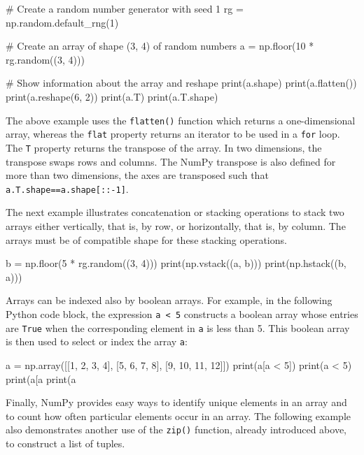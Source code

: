 \begin{samepage}
\begin{pythoncode}
# Create a random number generator with seed 1
rg = np.random.default_rng(1)

# Create an array of shape (3, 4) of random numbers
a = np.floor(10 * rg.random((3, 4)))

# Show information about the array and reshape
print(a.shape)
print(a.flatten())
print(a.reshape(6, 2))
print(a.T)
print(a.T.shape)
\end{pythoncode}
\end{samepage}

The above example uses the \texttt{flatten()} function which returns a one-dimensional array, whereas the \texttt{flat} property returns an iterator to be used in a \texttt{for} loop. The \texttt{T} property returns the transpose of the array. In two dimensions, the transpose swaps rows and columns. The NumPy transpose is also defined for more than two dimensions, the axes are transposed such that \texttt{a.T.shape==a.shape[::-1]}.

The next example illustrates concatenation or stacking operations to stack two arrays either vertically, that is, by row, or horizontally, that is, by column. The arrays must be of compatible shape for these stacking operations. 

\begin{samepage}
\begin{pythoncode}
b = np.floor(5 * rg.random((3, 4)))
print(np.vstack((a, b)))
print(np.hstack((b, a)))
\end{pythoncode}
\end{samepage}

Arrays can be indexed also by boolean arrays. For example, in the following Python code block, the expression \texttt{a < 5} constructs a boolean array whose entries are \texttt{True} when the corresponding element in \texttt{a} is less than 5. This boolean array is then used to select or index the array \texttt{a}:

\begin{samepage}
\begin{pythoncode}
a = np.array([[1, 2, 3, 4], 
              [5, 6, 7, 8], 
              [9, 10, 11, 12]])
print(a[a < 5])
print(a < 5)
print(a[a%
print(a%
\end{pythoncode}
\end{samepage}

Finally, NumPy provides easy ways to identify unique elements in an array and to count how often particular elements occur in an array. The following example also demonstrates another use of the \texttt{zip()} function, already introduced above, to construct a list of tuples.

